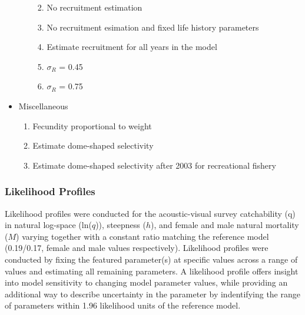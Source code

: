 \documentclass[11pt,
  english,
  letterpaper,
]{article}
\providecommand{\tightlist}{%
  \setlength{\itemsep}{0pt}\setlength{\parskip}{0pt}}
\providecommand{\tightlist}{%
  \setlength{\itemsep}{0pt}\setlength{\parskip}{0pt}}
\begin{document}
\begin{itemize}
\begin{itemize}
    \begin{enumerate}
    \def\labelenumi{\arabic{enumi}.}
    \setcounter{enumi}{11}
    \tightlist
    \item
      No recruitment estimation
    \item
      No recruitment esimation and fixed life history parameters
    \item
      Estimate recruitment for all years in the model
    \item
      \(\sigma_R\) = 0.45
    \item
      \(\sigma_R\) = 0.75\\
    \end{enumerate}
  \end{itemize}
\item
  Miscellaneous

  \begin{enumerate}
  \def\labelenumi{\arabic{enumi}.}
  \setcounter{enumi}{16}
  \tightlist
  \item
    Fecundity proportional to weight
  \item
    Estimate dome-shaped selectivity
  \item
    Estimate dome-shaped selectivity after 2003 for recreational fishery
  \end{enumerate}
\end{itemize}

\hypertarget{likelihood-profiles}{%
\subsubsection{Likelihood Profiles}\label{likelihood-profiles}}

Likelihood profiles were conducted for the acoustic-visual survey catchability (q) in natural log-space (ln(\(q\))), steepness (\(h\)), and female and male natural mortality (\(M\)) varying together with a constant ratio matching the reference model (0.19/0.17, female and male values respectively). Likelihood profiles were conducted by fixing the featured parameter(s) at specific values across a range of values and estimating all remaining parameters. A likelihood profile offers insight into model sensitivity to changing model parameter values, while providing an additional way to describe uncertainty in the parameter by indentifying the range of parameters within 1.96 likelihood units of the reference model.
\end{document}
